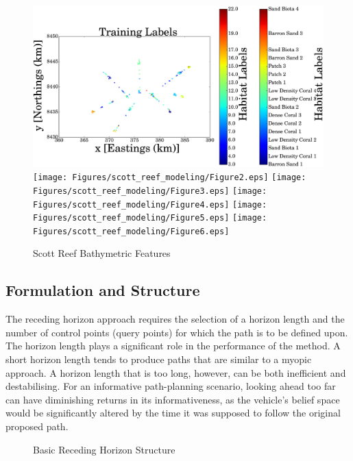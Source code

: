 \documentclass{article}
\begin{document}
	\begin{figure}[!htbp]
	\centering
		\includegraphics[width = 0.32\linewidth]{Figures/scott_reef_modeling/Figure1.eps}
		\texttt{[image: Figures/scott\_reef\_modeling/Figure2.eps]}
		\texttt{[image: Figures/scott\_reef\_modeling/Figure3.eps]}
		\texttt{[image: Figures/scott\_reef\_modeling/Figure4.eps]}
		\texttt{[image: Figures/scott\_reef\_modeling/Figure5.eps]}
		\texttt{[image: Figures/scott\_reef\_modeling/Figure6.eps]}
	\caption{Scott Reef Bathymetric Features}
	\label{Figure:Results:ScottReefBathymetricFeatures}
	\end{figure}
	
	\subsection{Formulation and Structure}

		The receding horizon approach requires the selection of a horizon length and the number of control points (query points) for which the path is to be defined upon. The horizon length plays a significant role in the performance of the method. A short horizon length tends to produce paths that are similar to a myopic approach. A horizon length that is too long, however, can be both inefficient and destabilising. For an informative path-planning scenario, looking ahead too far can have diminishing returns in its informativeness, as the vehicle's belief space would be significantly altered by the time it was supposed to follow the original proposed path.

	
		\begin{figure}[!htbp]
			\begin{center}
			\end{center}
		\caption{Basic Receding Horizon Structure}
		\label{Figure:Results:RecedingHorizonMethodOutline}
		\end{figure}
				
\end{document}
